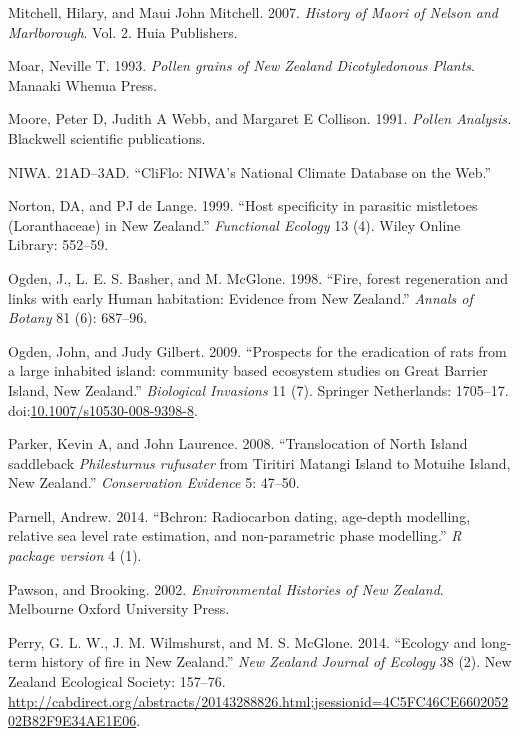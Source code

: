 \hypertarget{ref-mitchell2007history}{}
Mitchell, Hilary, and Maui John Mitchell. 2007. \emph{History of Maori
of Nelson and Marlborough}. Vol. 2. Huia Publishers.

\hypertarget{ref-moar1993pollen}{}
Moar, Neville T. 1993. \emph{Pollen grains of New Zealand Dicotyledonous
Plants}. Manaaki Whenua Press.

\hypertarget{ref-moore1991pollen}{}
Moore, Peter D, Judith A Webb, and Margaret E Collison. 1991.
\emph{Pollen Analysis.} Blackwell scientific publications.

\hypertarget{ref-CliFlo}{}
NIWA. 21AD--3AD. ``CliFlo: NIWA's National Climate Database on the
Web.''

\hypertarget{ref-norton1999host}{}
Norton, DA, and PJ de Lange. 1999. ``Host specificity in parasitic
mistletoes (Loranthaceae) in New Zealand.'' \emph{Functional Ecology} 13
(4). Wiley Online Library: 552--59.

\hypertarget{ref-OgdenJ}{}
Ogden, J., L. E. S. Basher, and M. McGlone. 1998. ``Fire, forest
regeneration and links with early Human habitation: Evidence from New
Zealand.'' \emph{Annals of Botany} 81 (6): 687--96.

\hypertarget{ref-Ogden2009}{}
Ogden, John, and Judy Gilbert. 2009. ``Prospects for the eradication of
rats from a large inhabited island: community based ecosystem studies on
Great Barrier Island, New Zealand.'' \emph{Biological Invasions} 11 (7).
Springer Netherlands: 1705--17.
doi:\href{https://doi.org/10.1007/s10530-008-9398-8}{10.1007/s10530-008-9398-8}.

\hypertarget{ref-parker2008translocation}{}
Parker, Kevin A, and John Laurence. 2008. ``Translocation of North
Island saddleback \emph{Philesturnus rufusater} from Tiritiri Matangi
Island to Motuihe Island, New Zealand.'' \emph{Conservation Evidence} 5:
47--50.

\hypertarget{ref-parnell2014bchron}{}
Parnell, Andrew. 2014. ``Bchron: Radiocarbon dating, age-depth
modelling, relative sea level rate estimation, and non-parametric phase
modelling.'' \emph{R package version} 4 (1).

\hypertarget{ref-PawsonE}{}
Pawson, and Brooking. 2002. \emph{Environmental Histories of New
Zealand}. Melbourne Oxford University Press.

\hypertarget{ref-Perry2014}{}
Perry, G. L. W., J. M. Wilmshurst, and M. S. McGlone. 2014. ``Ecology
and long-term history of fire in New Zealand.'' \emph{New Zealand
Journal of Ecology} 38 (2). New Zealand Ecological Society: 157--76.
\url{http://cabdirect.org/abstracts/20143288826.html;jsessionid=4C5FC46CE660205202B82F9E34AE1E06}.

